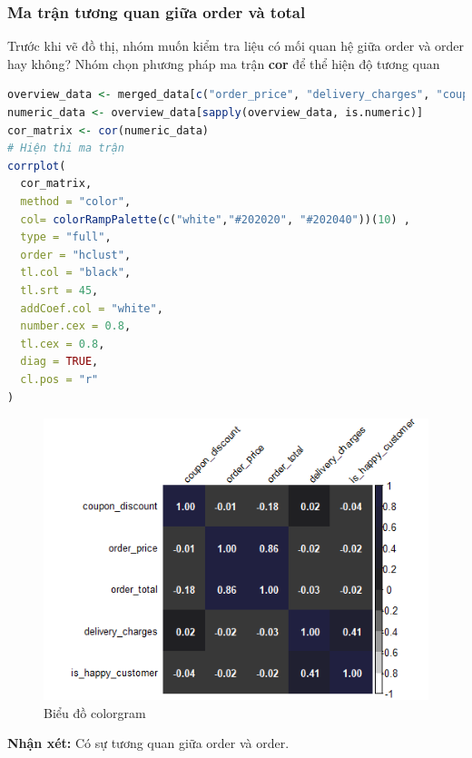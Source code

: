 \subsubsection{Ma trận tương quan giữa order và total}
Trước khi vẽ đồ thị, nhóm muốn kiểm tra liệu có mối quan hệ giữa order và order hay không? Nhóm chọn phương pháp ma trận \textbf{cor} để thể hiện độ tương quan

\begin{lstlisting}[language=R,caption=Code kiểm tra độ tương quan]
overview_data <- merged_data[c("order_price", "delivery_charges", "coupon_discount","order_total", "is_expedited_delivery", "is_happy_customer", "shopping_cart")]
numeric_data <- overview_data[sapply(overview_data, is.numeric)]
cor_matrix <- cor(numeric_data)
# Hiện thi ma trận
corrplot(
  cor_matrix,
  method = "color",
  col= colorRampPalette(c("white","#202020", "#202040"))(10) ,
  type = "full",
  order = "hclust",
  tl.col = "black",
  tl.srt = 45,
  addCoef.col = "white",
  number.cex = 0.8,
  tl.cex = 0.8,
  diag = TRUE,
  cl.pos = "r"
)
\end{lstlisting}
\begin{figure}[H]
    \centering \includegraphics[width=15cm]{Images/img/4.3_plotting_data/order_price_total.png}
    \caption{Biểu đồ colorgram}
\end{figure}

\begin{boxH}
\textbf{Nhận xét:} Có sự tương quan giữa order và order.
\end{boxH}
